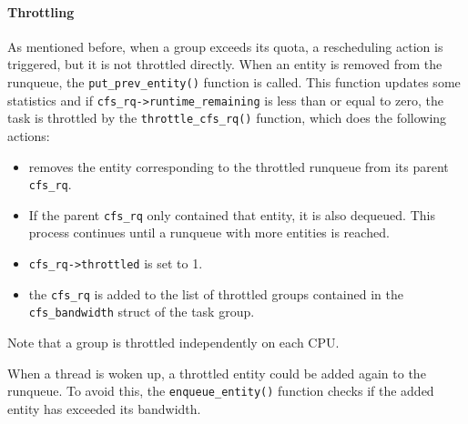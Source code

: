 \paragraph{Throttling}%
As mentioned before, when a group exceeds its quota, a rescheduling action is triggered, but it is not throttled directly. When an entity is removed from the runqueue, the \verb|put_prev_entity()| function is called. This function updates some statistics and if \verb|cfs_rq->runtime_remaining| is less than or equal to zero, the task is throttled by the \verb|throttle_cfs_rq()| function, which does the following actions:
\begin{itemize}
    \item removes the entity corresponding to the throttled runqueue from its parent \verb|cfs_rq|.
    \item If the parent \verb|cfs_rq| only contained that entity, it is also dequeued. This process continues until a runqueue with more entities is reached.
    \item \verb|cfs_rq->throttled| is set to 1.
    \item the \verb|cfs_rq| is added to the list of throttled groups contained in the \verb|cfs_bandwidth| struct of the task group.
\end{itemize}
Note that a group is throttled independently on each CPU.

When a thread is woken up, a throttled entity could be added again to the runqueue. To avoid this, the \verb|enqueue_entity()| function checks if the added entity has exceeded its bandwidth.


